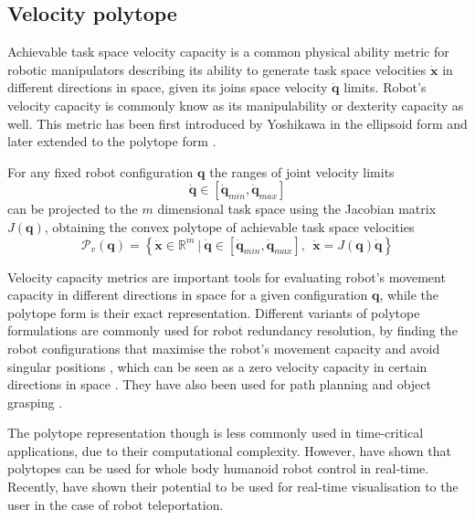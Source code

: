 \subsection{Velocity polytope}
\label{ch:vel_poly}

Achievable task space velocity capacity is a common physical ability metric for robotic manipulators describing its ability to generate task space velocities $\dot{\bm{x}}$ in different directions in space, given its joins space velocity $\dot{\bm{q}}$ limits. Robot's velocity capacity is commonly know as its manipulability or dexterity capacity as well. This metric has been first introduced by Yoshikawa \cite{yoshikawa1985manipulability} in the ellipsoid form and later extended to the polytope form \cite{chiacchio_global_1991, Lee1997manip}. %

For any fixed robot configuration $\bm{q}$ the ranges of joint velocity limits 
\begin{equation}
   \dot{\bm{q}}\in\left[\dot{\bm{q}}_{min}, \dot{\bm{q}}_{max} \right]
\end{equation}
can be projected to the $m$ dimensional task space using the Jacobian matrix $J(\bm{q})$, obtaining the convex polytope of achievable task space velocities  
\begin{equation}
    \mathcal{P}_v(\bm{q}) = \left\{ \dot{\bm{x}} \in \mathbb{R}^m ~|~ \dot{\bm{q}}\in\left[\dot{\bm{q}}_{min}, \dot{\bm{q}}_{max} \right], ~~ \dot{\bm{x}} = J(\bm{q})\dot{\bm{q}} \right\}
    \label{eq:poly_vel_rob}
\end{equation}

Velocity capacity metrics are important tools for evaluating robot's movement capacity in different directions in space for a given configuration $\bm{q}$, while the polytope form is their exact representation. Different variants of polytope formulations are commonly used for robot redundancy resolution, by finding the robot configurations that maximise the robot's movement capacity and avoid singular positions \cite{Marani2002,Thygeson2017}, which can be seen as a zero velocity capacity in certain directions in space \cite{merlet_jacobian_2006}.  They have also been used for path planning \cite{Pardi2020,Nagatani2002} and object grasping \cite{Fei2019,XU2021300}. 

The polytope representation though is less commonly used in time-critical applications, due to their computational complexity. However, \citet{long_constrained_2020} have shown that polytopes can be used for whole body humanoid robot control in real-time. Recently, \citet{Zolotas2021} have shown their potential to be used for real-time visualisation to the user in the case of robot teleportation. 

